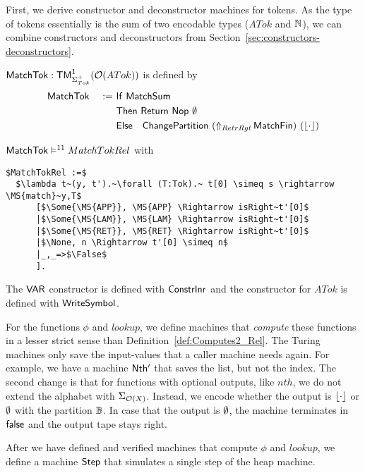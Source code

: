 First, we derive constructor and deconstructor machines for tokens.  As the type of tokens essentially is the sum of two encodable types ($ATok$ and
$\Nat$), we can combine constructors and deconstructors from Section~\ref{sec:constructors-deconstructors}.
\begin{definition}[$\MS{MatchTok}$]
  $\MS{MatchTok} : \TM_{\Sigma^+_{Tok}}^1(\Option(ATok))$ is defined by
  \begin{alignat*}{2}
    & \MS{MatchTok} &~:=~& \MS{If}~\MS{MatchSum} \\
    &               &    & \MS{Then}~   \Return{\Nop}{\None} \\
    &               &    & \MS{Else}~~~ \MS{ChangePartition}~(\LiftAlphabet{\MS{MatchFin}}{RetrRgt})~(\Some\cdot)
  \end{alignat*}
\end{definition}
\begin{lemma}
  \label{lem:MatchTok_Realise}
  $\MS{MatchTok} \RealiseIn{11} MatchTokRel$ with
\begin{lstlisting}[style=semicoqstyle]
$MatchTokRel :=$
  $\lambda t~(y, t').~\forall (T:Tok).~ t[0] \simeq s \rightarrow \MS{match}~y,T$
      [$\Some{\MS{APP}}, \MS{APP} \Rightarrow isRight~t'[0]$
      |$\Some{\MS{LAM}}, \MS{LAM} \Rightarrow isRight~t'[0]$
      |$\Some{\MS{RET}}, \MS{RET} \Rightarrow isRight~t'[0]$
      |$\None, n \Rightarrow t'[0] \simeq n$
      |_,_=>$\False$
      ].
\end{lstlisting}
\end{lemma}
The $\MS{VAR}$ constructor is defined with $\MS{ConstrInr}$ and the constructor for $ATok$ is defined with $\MS{WriteSymbol}$.

For the functions $\phi$ and $lookup$, we define machines that \textit{compute} these functions in a lesser strict sense than
Definition~\ref{def:Computes2_Rel}.  The Turing machines only save the input-values that a caller machine needs again.  For example, we have a machine
$\MS{Nth'}$ that saves the list, but not the index.  The second change is that for functions with optional outputs, like $nth$, we do not extend the
alphabet with $\Sigma_{\Option(X)}$.  Instead, we encode whether the output is $\Some{\cdot}$ or $\None$ with the partition $\Bool$.  In case that the
output is $\None$, the machine terminates in $\false$ and the output tape stays right.

After we have defined and verified machines that compute $\phi$ and $lookup$, we define a machine $\MS{Step}$ that simulates a single step of the heap
machine.


